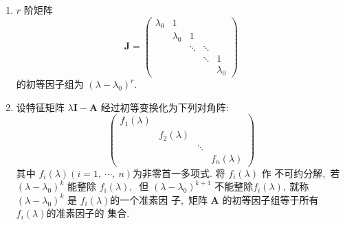 \begin{enumerate}
		\item  $r$  阶矩阵
		$$\boldsymbol{J}=\left(\begin{array}{ccccc}
			\lambda_{0} & 1 & & & \\
			& \lambda_{0} & 1 & & \\
			& & \ddots & \ddots & \\
			& & & \ddots & 1 \\
			& & & & \lambda_{0}
		\end{array}\right)$$
		的初等因子组为  $\left(\lambda-\lambda_{0}\right)^{r} .$
		\item 设特征矩阵  $\lambda \boldsymbol{I}-\boldsymbol{A} $ 经过初等变换化为下列对角阵:
		$$\left(\begin{array}{llll}
			f_{1}(\lambda) & & & \\
			& f_{2}(\lambda) & & \\
			& & \ddots & \\
			& & & f_{n}(\lambda)
		\end{array}\right)$$
		其中 $ f_{i}(\lambda)(i=1,\  \cdots,\  n)  $为非零首一多项式. 将  $f_{i}(\lambda)$  作 不可约分解,\  若  $\left(\lambda-\lambda_{0}\right)^{k} $ 能整除  $f_{i}(\lambda) ,\ $ 但  $\left(\lambda-\lambda_{0}\right)^{k+1} $ 不能整除$  f_{i}(\lambda) ,\  $就称  $\left(\lambda-\lambda_{0}\right)^{k}$  是  $f_{i}(\lambda)  $的一个准素因 子,\  矩阵 $ \boldsymbol{A}$  的初等因子组等于所有  $f_{i}(\lambda)  $的准素因子的 集合.
		

\end{enumerate}
